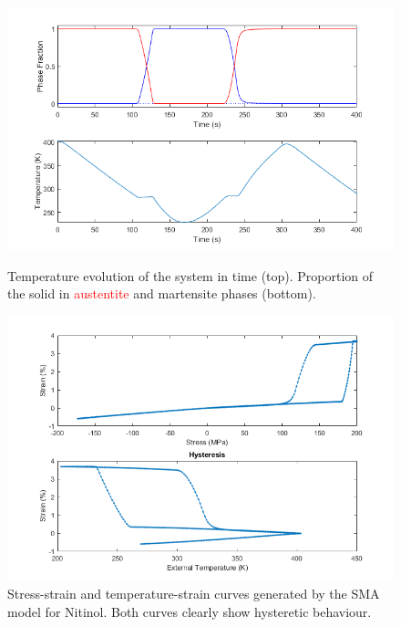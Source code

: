 \begin{figure}[ht]
\begin{minipage}{0.48\textwidth}
    \centering
    \includegraphics[width=\textwidth]{._figures/graphphases.png}
    \caption[Plots generated by SMA code in Matlab]{Temperature evolution of the system in time (top). Proportion of the solid in \textcolor{red}{austentite} and \textcolor{blue!50!black}{martensite} phases (bottom).}
    \label{fig:simgraph1}
\end{minipage}\hfill
\begin{minipage}{0.48\textwidth}
    \centering
    \includegraphics[width=\textwidth]{._figures/stressstrain.png}
    \caption[Stress-strain curve generated by SMA code in Matlab]{Stress-strain and temperature-strain curves generated by the SMA model for Nitinol. Both curves clearly show hysteretic behaviour.}
    \label{fig:simgraph2}
\end{minipage}
\end{figure}